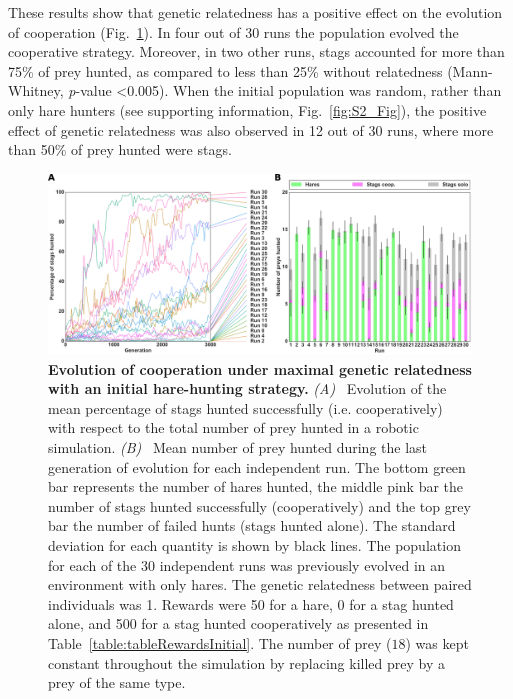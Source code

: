     These results show that genetic relatedness has a positive effect on the evolution of cooperation (Fig.~\ref{fig:graphAltruism}). In four out of 30 runs the population evolved the cooperative strategy. Moreover, in two other runs, stags accounted for more than 75\% of prey hunted, as compared to less than 25\% without relatedness (Mann-Whitney, {\em p}-value \textless 0.005). When the initial population was random, rather than only hare hunters (see supporting information, Fig.~\ref{fig:S2_Fig}), the positive effect of genetic relatedness was also observed in 12 out of 30 runs, where more than 50\% of prey hunted were stags.

    \begin{figure}[h]
      \centerfloat
        \includegraphics[scale = 1.0]{fig/ArticleBio1/Fig7.png}
      \caption{\textbf{Evolution of cooperation under maximal genetic relatedness with an initial hare-hunting strategy.} 
      {\em (A)}~ Evolution of the mean percentage of stags hunted successfully (i.e. cooperatively) with respect to the total number of prey hunted in a robotic simulation. {\em (B)}~ Mean number of prey hunted during the last generation of evolution for each independent run. The bottom green bar represents the number of hares hunted, the middle pink bar the number of stags hunted successfully (cooperatively) and the top grey bar the number of failed hunts (stags hunted alone). The standard deviation for each quantity is shown by black lines. The population for each of the 30 independent runs was previously evolved in an environment with only hares. The genetic relatedness between paired individuals was 1. Rewards were 50 for a hare, 0 for a stag hunted alone, and 500 for a stag hunted cooperatively as presented in Table~\ref{table:tableRewardsInitial}. The number of prey ($18$) was kept constant throughout the simulation by replacing killed prey by a prey of the same type.}
      \label{fig:graphAltruism}
    \end{figure}

